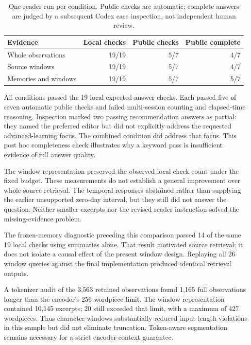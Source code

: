 \begin{table}[htbp]
\centering
\begin{tabular}{lrrr}
\toprule
Evidence & Local checks & Public checks & Public complete\\
\midrule
Whole observations & 19/19 & 5/7 & 4/7\\
Source windows & 19/19 & 5/7 & 4/7\\
Memories and windows & 19/19 & 5/7 & 5/7\\
\bottomrule
\end{tabular}
\caption{One reader run per condition. Public checks are automatic; complete answers are judged by a subsequent Codex case inspection, not independent human review.}
\label{tab:retrieval}
\end{table}

All conditions passed the 19 local expected-answer checks. Each passed five of seven automatic public checks and failed multi-session counting and elapsed-time reasoning. Inspection marked two passing recommendation answers as partial: they named the preferred editor but did not explicitly address the requested advanced-learning focus. The combined condition did address that focus. This post hoc completeness check illustrates why a keyword pass is insufficient evidence of full answer quality.

The window representation preserved the observed local check count under the fixed budget. These measurements do not establish a general improvement over whole-source retrieval. The temporal responses abstained rather than supplying the earlier unsupported zero-day interval, but they still did not answer the question. Neither smaller excerpts nor the revised reader instruction solved the missing-evidence problem.

The frozen-memory diagnostic preceding this comparison passed 14 of the same 19 local checks using summaries alone. That result motivated source retrieval; it does not isolate a causal effect of the present window design. Replaying all 26 window queries against the final implementation produced identical retrieval outputs.

A tokenizer audit of the 3,563 retained observations found 1,165 full observations longer than the encoder's 256-wordpiece limit. The window representation contained 10,145 excerpts; 20 still exceeded that limit, with a maximum of 427 wordpieces. Thus character windows substantially reduced input-length violations in this sample but did not eliminate truncation. Token-aware segmentation remains necessary for a strict encoder-context guarantee.
